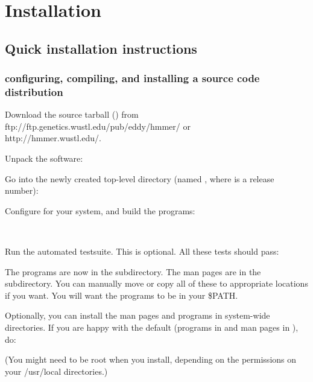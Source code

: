 \section{Installation}
\label{section:installation}

\subsection{Quick installation instructions}

\subsubsection{configuring, compiling, and installing a source code distribution}

Download the source tarball () from 
                  {ftp://ftp.genetics.wustl.edu/pub/eddy/hmmer/}
or \\
                  {http://hmmer.wustl.edu/}.

Unpack the software:


Go into the newly created top-level directory (named ,
where  is a release number):


Configure for your system, and build the programs:

\\

Run the automated testsuite. This is optional.  All these tests should
pass:


The programs are now in the  subdirectory. The man pages
are in the  subdirectory. You can manually
move or copy all of these to appropriate locations if you want. You
will want the programs to be in your \$PATH.

Optionally, you can install the man pages and programs in system-wide
directories. If you are happy with the default (programs in
 and man pages in ),
do:


(You might need to be root when you install, depending on the
permissions on your /usr/local directories.)


